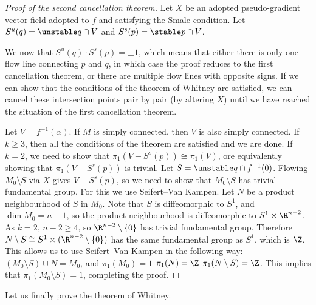 \begin{proof}[Proof of the second cancellation theorem]
    Let $X$ be an adopted pseudo-gradient vector field adopted to  $f$ and satisfying the Smale condition.
    Let $S^{u}(q) = \unstable q \cap V$ and $S^{s}(p) = \stable p \cap  V$.

    We now that $S^{u}(q) \cdot S^{s}(p) = \pm 1$, which means that either there is only one flow line connecting $p$ and  $q$, in which case the proof reduces to the first cancellation theorem, or there are multiple flow lines with opposite signs.
    If we can show that the conditions of the theorem of Whitney are satisfied, we can cancel these intersection points pair by pair (by altering $X$) until we have reached the situation of the first cancellation theorem.

    Let $V = f^{-1}(\alpha)$.  If $M$ is simply connected, then $V$ is also simply connected.
    If $k \ge 3$, then all the conditions of the theorem are satisfied and we are done.
    If $k = 2$, we need to show that  $\pi_1(V - S^{s}(p)) \cong \pi_1(V)$,
    ore equivalently showing that $\pi_1(V - S^{s}(p))$ is trivial.
    Let $S = \unstable q \cap f^{-1}(0)$.
    Flowing $M_0 \setminus S$ via $X$ gives  $V - S^{s}(p)$, so we need to show that $M_0 \setminus S$ has trivial fundamental group.
    For this we use Seifert--Van Kampen. Let $N$ be a product neighbourhood of $S$ in $M_0$.
    Note that $S$ is diffeomorphic to $S^{1}$, and $\dim M_0 = n-1$, so the product neighbourhood is diffeomorphic to $ S^1 \times \R^{n-2}$.
    As $k=2$, $n - 2 \ge 4$, so $\R^{n-2} \setminus \{ 0 \} $ has trivial fundamental group. Therefore $N \setminus S \cong S^{1} \times (\R^{n-2}\setminus \{0\})$ has the same fundamental group as $S^{1}$, which is $\Z$.
    This allows us to use Seifert--Van Kampen in the following way:
    $(M_0 \setminus S) \cup N = M_0$, and $\pi_1(M_0) = 1$ $\pi_1(N) = \Z$ $\pi_1(N \setminus S) = \Z$. This implies that $\pi_1(M_0 \setminus S) = 1$, completing the proof.
\end{proof}

Let us finally prove the theorem of Whitney.

